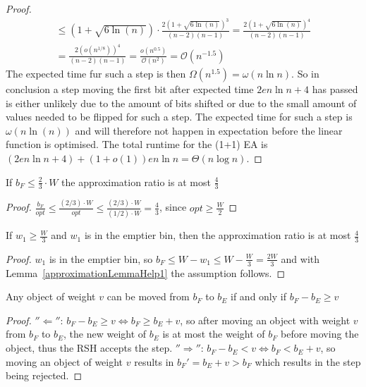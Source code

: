 \begin{proof}
\begin{gather}
        \nonumber \le ({1+\sqrt{6\ln(n)}})\cdot\frac{2{(1+\sqrt{6\ln(n)})}^{3}}{(n-2)(n-1)}
        = \frac{2{(1+\sqrt{6\ln(n)})}^{4}}{(n-2)(n-1)}\\ \nonumber
        = \frac{2{(o({n}^{1/8}))}^{4}}{(n-2)(n-1)}
        = \frac{o(n^{0.5})}{\mathcal{O}(n^{2})}
        = \mathcal{O}(n^{-1.5})
    \end{gather}
    The expected time fur such a step is then $\Omega(n^{1.5})=\omega(n\ln n)$.
    So in conclusion a step moving the first bit after expected time $2en\ln n+4$ has passed is either unlikely due to the amount of bits shifted or due to the small amount of values needed to be flipped for such a step.
    The expected time for such a step is $\omega(n\ln(n))$ and will therefore not happen in expectation before the linear function is optimised.
    The total runtime for the (1+1) EA is $(2en\ln n+4) + (1+o(1))en\ln n = \Theta(n\log{}n)$.
\end{proof}

\begin{lemma}\label{approximationLemmaHelp1}
    If \(b_F \le \frac{2}{3} \cdot W\) the approximation ratio is at most $\frac{4}{3}$
\end{lemma}
\begin{proof}
    \(\frac{b_F}{opt} \le \frac{(2/3) \cdot W}{opt} \le \frac{(2/3) \cdot W}{(1/2) \cdot W} = \frac{4}{3}\), since \(opt \ge \frac{W}{2}\)
\end{proof}

\begin{corollary}\label{approximationCorollaryHelp2}
    If \(w_1 \ge \frac{W}{3}\) and \(w_1\) is in the emptier bin, then the approximation ratio is at most $\frac{4}{3}$
\end{corollary}
\begin{proof}
    $w_1$ is in the emptier bin, so \( b_F \le W - w_1 \le W - \frac{W}{3} = \frac{2W}{3} \) and with Lemma~\ref{approximationLemmaHelp1} the assumption follows.
\end{proof}

\begin{lemma}\label{movingObjectsLemma}
    Any object of weight $v$ can be moved from $b_F$ to $b_E$ if and only if \(b_F - b_E \ge v\)
\end{lemma}
\begin{proof}
    $''\Leftarrow''$:\newline
    \(b_F - b_E \ge v \Leftrightarrow b_F \ge b_E + v\), so after moving an object with weight $v$ from $b_F$ to $b_E$, the new weight of $b_E$ is at most the weight of $b_F$ before moving the object, thus the RSH accepts the step.\newline
    $''\Rightarrow''$:\newline
    \(b_F - b_E < v \Leftrightarrow b_F < b_E + v\), so moving an object of weight $v$ results in ${b_F}' = b_E+v > b_F$ which results in the step being rejected.
\end{proof}


